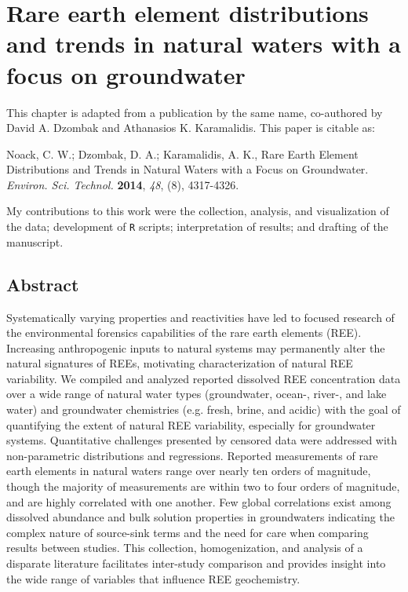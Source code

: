 \chapter{Rare earth element distributions and trends in natural waters with a focus on groundwater}\label{CH3}

This chapter is adapted from a publication by the same name, co-authored by David A. Dzombak and Athanasios K. Karamalidis.
This paper is citable as: 

Noack, C. W.; Dzombak, D. A.; Karamalidis, A. K., Rare Earth Element Distributions and Trends in Natural Waters with a Focus on Groundwater. \textit{Environ. Sci. Technol.} \textbf{2014}, \textit{48}, (8), 4317-4326.

My contributions to this work were the collection, analysis, and visualization of the data; development of \texttt{R} scripts; interpretation of results; and drafting of the manuscript.

\clearpage

\section*{Abstract}
Systematically varying properties and reactivities have led to focused research of the environmental forensics capabilities of the rare earth elements (REE).
Increasing anthropogenic inputs to natural systems may permanently alter the natural signatures of REEs, motivating characterization of natural REE variability.
We compiled and analyzed reported dissolved REE concentration data over a wide range of natural water types (groundwater, ocean-, river-, and lake water) and groundwater chemistries (e.g. fresh, brine, and acidic) with the goal of quantifying the extent of natural REE variability, especially for groundwater systems.
Quantitative challenges presented by censored data were addressed with non-parametric distributions and regressions.
Reported measurements of rare earth elements in natural waters range over nearly ten orders of magnitude, though the majority of measurements are within two to four orders of magnitude, and are highly correlated with one another.
Few global correlations exist among dissolved abundance and bulk solution properties in groundwaters indicating the complex nature of source-sink terms and the need for care when comparing results between studies.
This collection, homogenization, and analysis of a disparate literature facilitates inter-study comparison and provides insight into the wide range of variables that influence REE geochemistry.


